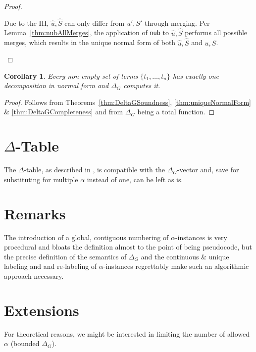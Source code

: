 \documentclass[a4paper, 11pt]{report}
\newtheorem{corollary}{Corollary}
\begin{document}
\begin{proof}
\begin{enumerate}
\begin{enumerate}
      Due to the IH, $\widehat{u},\widehat{S}$ can only differ from $u',S'$ through merging. Per Lemma~\ref{thm:nubAllMerges}, the application of \texttt{nub} to $\widehat{u},\widehat{S}$ performs all possible merges, which results in the unique normal form of both $\widehat{u},\widehat{S}$ and $u,S$.
    \end{enumerate}
  \end{enumerate}
\end{proof}

\begin{corollary}
  Every non-empty set of terms $\{t_1,\dots,t_n\}$ has exactly one decomposition in normal form and $\Delta_G$ computes it.
  \label{thm:deltaGCorrectness}
\end{corollary}

\begin{proof}
  Follows from Theorems~\ref{thm:DeltaGSoundness}, \ref{thm:uniqueNormalForm} \& \ref{thm:DeltaGCompleteness} and from $\Delta_G$ being a total function.
\end{proof}


\section{$\Delta$-Table}

The $\Delta$-table, as described in \cite{cutIntro2013}, is compatible with the $\Delta_G$-vector and, save for substituting for multiple $\alpha$ instead of one, can be left as is. 

\section{Remarks}

The introduction of a global, contiguous numbering of $\alpha$-instances is very procedural and bloats the definition almost to the point of being pseudocode, but the precise definition of the semantics of $\Delta_G$ and the continuous \& unique labeling and and re-labeling of $\alpha$-instances regrettably make such an algorithmic approach necessary.\\

\section{Extensions}

For theoretical reasons, we might be interested in limiting the number of allowed $\alpha$ (bounded $\Delta_G$).
\end{document}
